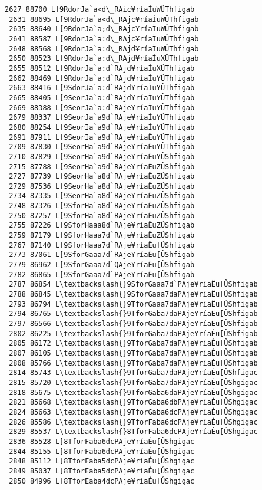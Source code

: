 \documentclass[11pt]{article}
\begin{document}
\begin{Verbatim}[commandchars=\\\{\}]
 2627 88700 L[9RdorJa`a<d\_RAic¥ríaÌuWÛThfigab
 2631 88695 L[9RdorJa`a<d\_RAjc¥ríaÌuWÛThfigab
 2635 88640 L[9RdorJa`a;d\_RAjc¥ríaÌuWÛThfigab
 2641 88587 L[9RdorJa`a:d\_RAjc¥ríaÌuWÛThfigab
 2648 88568 L[9RdorJa`a:d\_RAjd¥ríaÌuWÛThfigab
 2650 88523 L[9RdorJa`a:d\_RAjd¥ríaÌuXÛThfigab
 2655 88512 L[9RdorJa`a:d`RAjd¥ríaÌuXÛThfigab
 2662 88469 L[9RdorJa`a:d`RAjd¥ríaÌuYÛThfigab
 2663 88416 L[9SdorJa`a:d`RAjd¥ríaÌuYÛThfigab
 2665 88405 L[9SeorJa`a:d`RAjd¥ríaÌuYÛThfigab
 2669 88388 L[9SeorJa`a:d`RAje¥ríaÌuYÛThfigab
 2679 88337 L[9SeorJa`a9d`RAje¥ríaÌuYÛThfigab
 2680 88254 L[9SeorIa`a9d`RAje¥ríaÌuYÛThfigab
 2691 87911 L[9SeorIa`a9d`RAje¥ríaËuYÛThfigab
 2709 87830 L[9SeorHa`a9d`RAje¥ríaËuYÛThfigab
 2710 87829 L[9SeorHa`a9d`RAje¥ríaËuYÛShfigab
 2715 87788 L[9SeorHa`a9d`RAje¥ríaËuZÛShfigab
 2727 87739 L[9SeorHa`a8d`RAje¥ríaËuZÛShfigab
 2729 87536 L[9SeorHa`a8d`RAje¥ríaËuZÛShfigab
 2734 87335 L[9SeorHa`a8d`RAje¥ríaËuZÛShfigab
 2748 87326 L[9SforHa`a8d`RAje¥ríaËuZÛShfigab
 2750 87257 L[9SforHa`a8d`RAje¥ríaËuZÛShfigab
 2755 87226 L[9SforHaaa8d`RAje¥ríaËuZÛShfigab
 2759 87179 L[9SforHaaa7d`RAje¥ríaËuZÛShfigab
 2767 87140 L[9SforHaaa7d`RAje¥ríaËu[ÛShfigab
 2773 87061 L[9SforGaaa7d`RAje¥ríaËu[ÛShfigab
 2779 86962 L[9SforGaaa7d`QAje¥ríaËu[ÛShfigab
 2782 86865 L[9SforGaaa7d`PAje¥ríaËu[ÛShfigab
 2787 86854 L\textbackslash{}9SforGaaa7d`PAje¥ríaËu[ÛShfigab
 2788 86845 L\textbackslash{}9SforGaaa7daPAje¥ríaËu[ÛShfigab
 2793 86794 L\textbackslash{}9TforGaaa7daPAje¥ríaËu[ÛShfigab
 2794 86765 L\textbackslash{}9TforGaba7daPAje¥ríaËu[ÛShfigab
 2797 86566 L\textbackslash{}9TforGaba7daPAje¥ríaËu[ÛShfigab
 2802 86225 L\textbackslash{}9TforGaba7daPAje¥ríaÊu[ÛShfigab
 2805 86172 L\textbackslash{}9TforGaba7daPAje¥ríaÊu[ÛShfigab
 2807 86105 L\textbackslash{}9TforGaba7daPAje¥ríaÊu[ÛShfigab
 2808 85766 L\textbackslash{}9TforGaba7daPAje¥ríaÉu[ÛShfigab
 2814 85743 L\textbackslash{}9TforGaba7daPAje¥ríaÉu[ÛShfigac
 2815 85720 L\textbackslash{}9TforGaba7daPAje¥ríaÉu[ÛShgigac
 2818 85675 L\textbackslash{}9TforGaba6daPAje¥ríaÉu[ÛShgigac
 2821 85668 L\textbackslash{}9TforGaba6dbPAje¥ríaÉu[ÛShgigac
 2824 85663 L\textbackslash{}9TforGaba6dcPAje¥ríaÉu[ÛShgigac
 2826 85586 L\textbackslash{}9TforFaba6dcPAje¥ríaÉu[ÛShgigac
 2829 85537 L\textbackslash{}8TforFaba6dcPAje¥ríaÉu[ÛShgigac
 2836 85528 L]8TforFaba6dcPAje¥ríaÉu[ÛShgigac
 2844 85155 L]8TforFaba6dcPAje¥ríaÉu[ÚShgigac
 2848 85112 L]8TforFaba5dcPAje¥ríaÉu[ÚShgigac
 2849 85037 L]8TforEaba5dcPAje¥ríaÉu[ÚShgigac
 2850 84996 L]8TforEaba4dcPAje¥ríaÉu[ÚShgigac

\end{Verbatim}
\end{document}
